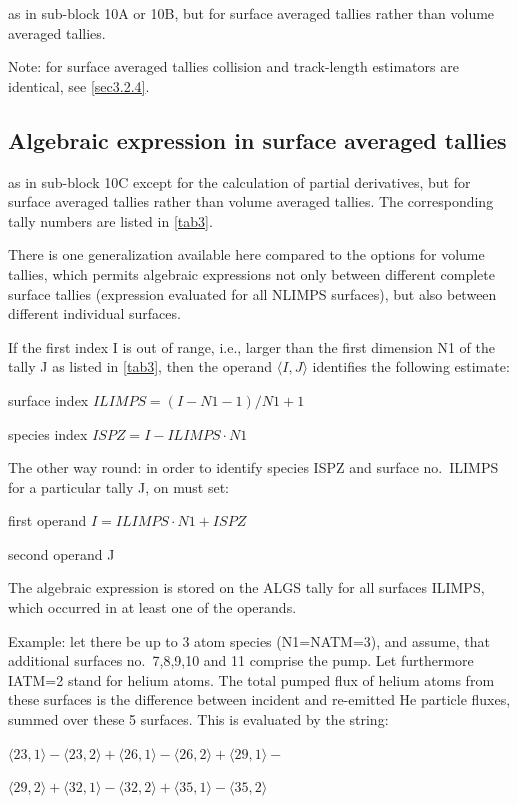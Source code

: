 as in sub-block 10A or 10B, but for surface averaged tallies rather than
volume averaged tallies.

Note: for surface averaged tallies collision and track-length estimators are
identical, see \cref{sec3.2.4}.

\subsection{Algebraic expression in surface averaged tallies}\label{sec2.10F}

as in sub-block 10C except for the calculation of partial derivatives,
but for surface averaged tallies rather than volume averaged tallies.
The corresponding tally numbers are listed in \cref{tab3}.

There is one generalization available here compared to the options for volume
tallies, which permits algebraic expressions not only between different
complete surface tallies (expression evaluated for all NLIMPS surfaces), but
also between different individual surfaces.

If the first index I is out of range, i.e., larger than the first dimension N1
of the tally J as listed in \cref{tab3}, then the operand $\langle I,J\rangle$
identifies the following estimate:

surface index $ILIMPS = (I-N1-1)/N1 + 1 $

species index $ISPZ = I - ILIMPS \cdot N1 $

The other way round: in order to identify species ISPZ and surface no.\ ILIMPS
for a particular tally J, on must set:

first operand $I = ILIMPS \cdot N1 + ISPZ  $

second operand	J

The algebraic expression is stored on the ALGS tally for all surfaces ILIMPS,
which occurred in at least one of the operands.

Example: let there be up to 3 atom species (N1=NATM=3), and assume, that
additional surfaces no.\ 7,8,9,10 and 11 comprise the pump.
Let furthermore IATM=2 stand for helium atoms.
The total pumped flux of helium atoms from these surfaces is the difference
between incident and re-emitted He particle fluxes, summed over these 5
surfaces.
This is evaluated by the string:

$\langle 23,1\rangle-\langle 23,2\rangle+\langle 26,1\rangle-\langle
  26,2\rangle+\langle 29,1\rangle-$

$\langle 29,2\rangle+\langle 32,1\rangle-\langle 32,2\rangle+\langle
  35,1\rangle-\langle 35,2\rangle$

